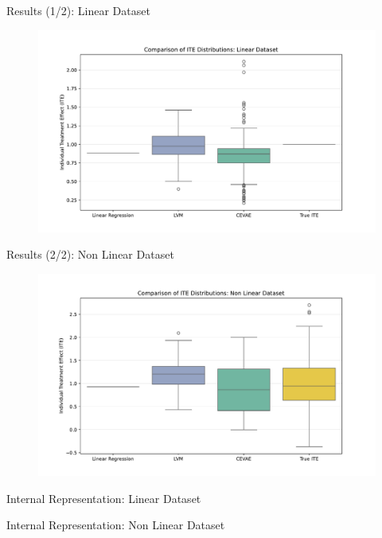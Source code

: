 \documentclass[10pt]{beamer}
\begin{document}
\begin{frame}{Results (1/2): Linear Dataset}
    \begin{figure}[H]
      \includegraphics[width=\textwidth]{images/boxplot_linear.pdf}
    \end{figure}
\end{frame}

\begin{frame}{Results (2/2): Non Linear Dataset}
    \begin{figure}[H]
      \includegraphics[width=\textwidth]{images/boxplot_non_linear.pdf}
    \end{figure}
\end{frame}

\begin{frame}{Internal Representation: Linear Dataset}
\end{frame}

\begin{frame}{Internal Representation: Non Linear Dataset}
\end{frame}
\end{document}
